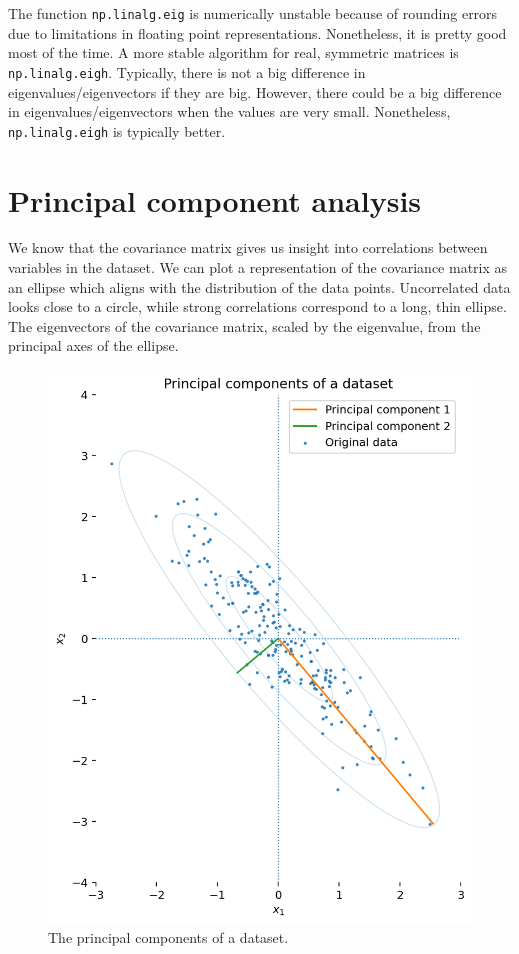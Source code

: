 \documentclass[a4paper, openany]{memoir}
\begin{document}
    The function \texttt{np.linalg.eig} is numerically unstable because of rounding errors due to limitations in floating point representations. Nonetheless, it is pretty good most of the time. A more stable algorithm for real, symmetric matrices is \texttt{np.linalg.eigh}. Typically, there is not a big difference in eigenvalues/eigenvectors if they are big. However, there could be a big difference in eigenvalues/eigenvectors when the values are very small. Nonetheless, \texttt{np.linalg.eigh} is typically better.
    \newpage

    \section{Principal component analysis}
    We know that the covariance matrix gives us insight into correlations between variables in the dataset. We can plot a representation of the covariance matrix as an ellipse which aligns with the distribution of the data points. Uncorrelated data looks close to a circle, while strong correlations correspond to a long, thin ellipse. The eigenvectors of the covariance matrix, scaled by the eigenvalue, from the principal axes of the ellipse.
    \begin{figure}[H]
        \centering
        \includegraphics[scale=0.6]{src/3.29 Principal components of a dataset.png}
        \caption{The principal components of a dataset.}
    \end{figure}
\end{document}
